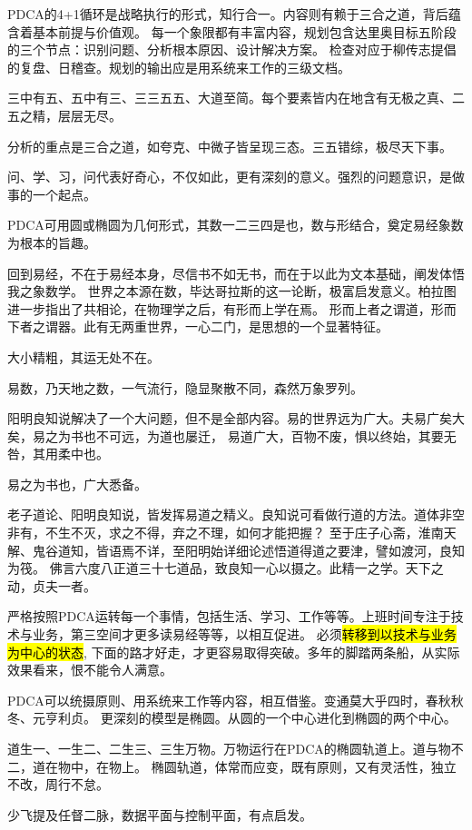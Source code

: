 PDCA的4+1循环是战略执行的形式，知行合一。内容则有赖于三合之道，背后蕴含着基本前提与价值观。
每一个象限都有丰富内容，规划包含达里奥目标五阶段的三个节点：识别问题、分析根本原因、设计解决方案。
检查对应于柳传志提倡的复盘、日稽查。规划的输出应是用系统来工作的三级文档。

三中有五、五中有三、三三五五、大道至简。每个要素皆内在地含有无极之真、二五之精，层层无尽。

分析的重点是三合之道，如夸克、中微子皆呈现三态。三五错综，极尽天下事。

问、学、习，问代表好奇心，不仅如此，更有深刻的意义。强烈的问题意识，是做事的一个起点。

PDCA可用圆或椭圆为几何形式，其数一二三四是也，数与形结合，奠定易经象数为根本的旨趣。

回到易经，不在于易经本身，尽信书不如无书，而在于以此为文本基础，阐发体悟我之象数学。
世界之本源在数，毕达哥拉斯的这一论断，极富启发意义。柏拉图进一步指出了共相论，在物理学之后，有形而上学在焉。
形而上者之谓道，形而下者之谓器。此有无两重世界，一心二门，是思想的一个显著特征。

大小精粗，其运无处不在。

易数，乃天地之数，一气流行，隐显聚散不同，森然万象罗列。

阳明良知说解决了一个大问题，但不是全部内容。易的世界远为广大。夫易广矣大矣，易之为书也不可远，为道也屡迁，
易道广大，百物不废，惧以终始，其要无咎，其用柔中也。

易之为书也，广大悉备。

老子道论、阳明良知说，皆发挥易道之精义。良知说可看做行道的方法。道体非空非有，不生不灭，求之不得，弃之不理，如何才能把握？
至于庄子心斋，淮南天解、鬼谷道知，皆语焉不详，至阳明始详细论述悟道得道之要津，譬如渡河，良知为筏。
佛言六度八正道三十七道品，致良知一心以摄之。此精一之学。天下之动，贞夫一者。

严格按照PDCA运转每一个事情，包括生活、学习、工作等等。上班时间专注于技术与业务，第三空间才更多读易经等等，以相互促进。
必须\hl{转移到以技术与业务为中心的状态}, 下面的路才好走，才更容易取得突破。多年的脚踏两条船，从实际效果看来，恨不能令人满意。

PDCA可以统摄原则、用系统来工作等内容，相互借鉴。变通莫大乎四时，春秋秋冬、元亨利贞。
更深刻的模型是椭圆。从圆的一个中心进化到椭圆的两个中心。

道生一、一生二、二生三、三生万物。万物运行在PDCA的椭圆轨道上。道与物不二，道在物中，在物上。
椭圆轨道，体常而应变，既有原则，又有灵活性，独立不改，周行不怠。

少飞提及任督二脉，数据平面与控制平面，有点启发。

